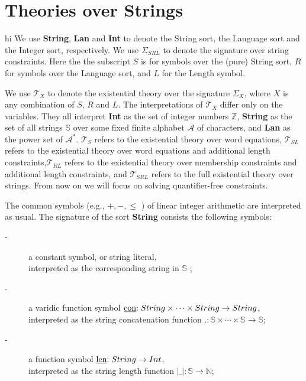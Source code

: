 \section{Theories over Strings}
\label{sec:Theories over Strings}
hi 
We use \textbf{String}, \textbf{Lan} and \textbf{Int} to denote the String sort, the Language sort and the Integer sort, respectively. We use \( \Sigma_{ SRL}\) to denote the signature over string constraints. Here the the subscript \(S\) is for symbols over the (pure) String sort, \(R\) for symbols over the Language sort, and \(L\) for the Length symbol. 

We use \( \mathcal{T}_X\)  to denote the existential theory over the signature \( \Sigma_X\), where \(X\) is any combination of \(S\), \(R\) and \(L\). The interpretations of \( \mathcal{T}_X\) differ only on the variables. They all interpret \textbf{Int} as the set of integer numbers  \(\mathbb{Z}\), \textbf{String} as the set of all strings  \(\mathbb{S}\)  over some fixed finite alphabet  \(\mathcal{A}\) of characters, and \textbf{Lan} as the power set of \(\mathcal{A}^* \). \( \mathcal{T}_S\) refers to the existential theory over word equations, 
\( \mathcal{T}_{SL}\)  refers to the existential theory over word equations and additional length constraints,\( \mathcal{T}_{RL}\) refers to the existential theory over membership constraints and additional length constraints, and \(\mathcal{T}_{SRL}\) refers to the full existential theory over strings. From now on we will focus on solving quantifier-free constraints.

The common symbols (e.g., \( + , - ,  \le \) ) of linear integer arithmetic are interpreted as usual. The signature of the sort \textbf{String} consists the following symbols:

\begin{description}
	\item[-] a constant symbol, or string literal, \\interpreted as the corresponding string in  \(\mathbb{S}\) ;
	\item[-] a varidic function symbol \($\underline{con}$ : String \times \cdots \times String \to String\), \\interpreted as the string concatenation function \(. : \mathbb S \times \cdots \times \mathbb S \to \mathbb S\);
	\item[-] a function symbol \($\underline{len}$ : String  \to Int \),\\ interpreted as the string length function \(  |\_| : \mathbb S  \to \mathbb N\);
\end{description}


